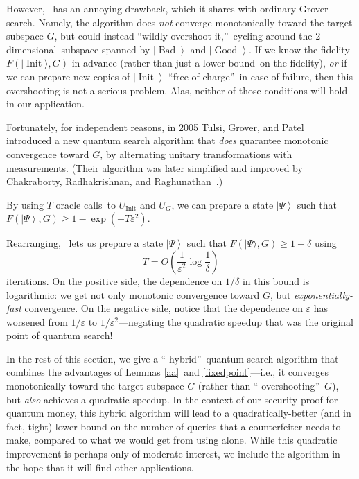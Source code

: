 However, \ has an annoying drawback, which it shares with
ordinary Grover search. Namely, the algorithm does \emph{not} converge
monotonically toward the target subspace $G$, but could instead
\textquotedblleft wildly overshoot it,\textquotedblright\ cycling around the
$2$-dimensional\ subspace spanned by $\left\vert \operatorname*{Bad}%
\right\rangle $ and $\left\vert \operatorname*{Good}\right\rangle $. If we
know the fidelity $F(\vert \operatorname*{Init}\rangle
,G)$ in advance (rather than just a lower bound\ on the fidelity),
\emph{or} if we can prepare new copies of $\left\vert \operatorname*{Init}%
\right\rangle $ \textquotedblleft free of charge\textquotedblright\ in case of
failure, then this overshooting is not a serious problem. Alas, neither of
those conditions will hold in our application.

Fortunately, for independent reasons, in 2005 Tulsi, Grover, and Patel~\cite{tgp} introduced a new quantum search algorithm that \emph{does}
guarantee monotonic convergence toward $G$, by alternating unitary
transformations with measurements. (Their algorithm was later simplified and
improved by Chakraborty, Radhakrishnan, and Raghunathan~\cite{crr}.)

\begin{lemma}
\label{fixedpoint}By using $T$
oracle calls\ to $U_{\operatorname*{Init}}$ and $U_{G}$, we can prepare a
state $\left\vert \Psi\right\rangle $ such that $F\left(  \left\vert
\Psi\right\rangle ,G\right)  \geq1-\exp(  -T\varepsilon^{2})$.
\end{lemma}

Rearranging, \ lets us prepare a state $\left\vert
\Psi\right\rangle $ such that $F(\vert \Psi\rangle
,G)  \geq1-\delta$ using 
\[
T=O\left(\frac{1}{\varepsilon^{2}}\log
\frac{1}{\delta}\right)
\]
iterations. On the positive side, the dependence
on $1/\delta$ in this bound is logarithmic: we get not only monotonic
convergence toward $G$, but \emph{exponentially-fast} convergence. On the
negative side, notice that the dependence on $\varepsilon$ has worsened from
$1/\varepsilon$ to $1/\varepsilon^{2}$---negating the quadratic speedup that
was the original point of quantum search!

In the rest of this section, we give a \textquotedblleft
hybrid\textquotedblright\ quantum search algorithm that combines the
advantages of Lemmas \ref{aa}\ and \ref{fixedpoint}---i.e., it converges
monotonically toward the target subspace $G$ (rather than \textquotedblleft
overshooting\textquotedblright\ $G$), but \emph{also} achieves a quadratic
speedup. In the context of our security proof for quantum money, this hybrid
algorithm will lead to a quadratically-better (and in fact, tight) lower bound
on the number of queries that a counterfeiter needs to make, compared to what
we would get from using  alone. While this quadratic
improvement is perhaps only of moderate interest, we include the algorithm in
the hope that it will find other applications.

